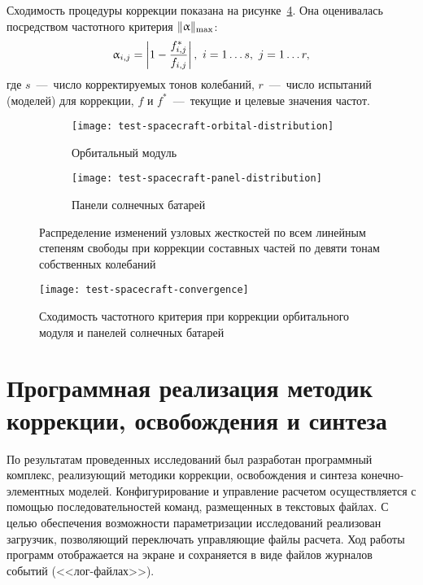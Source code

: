 Сходимость процедуры коррекции показана на рисунке~\ref{fig:test-spacecraft-convergence}. Она оценивалась посредством частотного критерия $ \lVert \mathbf{\upalpha} \rVert_{\max} $:
\begin{equation}
	\upalpha_{i, j} = \left| 1 - \frac{f ^ \ast_{i, j}}{f_{i, j}} \right|, \ i = 1 \hdots s, \ j = 1 \hdots r, \label{eq:convergenceCriterion}
\end{equation}
где $ s $~---~число корректируемых тонов колебаний, $ r $~---~число испытаний (моделей) для коррекции, $ f $ и $ f ^ \ast $~---~текущие и целевые значения частот. 

\begin{figure}[!htb]
	\centering
	\begin{subfigure}[t]{\sfSpacecraft}
		\centering
		\texttt{[image: test-spacecraft-orbital-distribution]}
		\caption{Орбитальный модуль} \label{subfig:test-orbital-distribution} 
	\end{subfigure}
	\hfill
	\begin{subfigure}[t]{\sfSpacecraft}
		\centering
		\texttt{[image: test-spacecraft-panel-distribution]}
		\caption{Панели солнечных батарей} \label{subfig:test-panel-distribution} 
	\end{subfigure} 
	\caption{Распределение изменений узловых жесткостей по всем линейным степеням свободы при коррекции составных частей по девяти тонам собственных колебаний} 
\end{figure}

\begin{figure}[!htb]
	\centering
	\texttt{[image: test-spacecraft-convergence]}
	\caption{Сходимость частотного критерия при коррекции орбитального модуля и панелей солнечных батарей}  \label{fig:test-spacecraft-convergence}
\end{figure}

\section{Программная реализация методик коррекции, освобождения и синтеза}

По результатам проведенных исследований был разработан программный комплекс, реализующий методики коррекции, освобождения и синтеза конечно-элементных моделей. Конфигурирование и управление расчетом осуществляется с помощью последовательностей команд, размещенных в текстовых файлах. С целью обеспечения возможности параметризации исследований реализован загрузчик, позволяющий переключать управляющие файлы расчета. Ход работы программ отображается на экране и сохраняется в виде файлов журналов событий (<<лог-файлах>>). 

